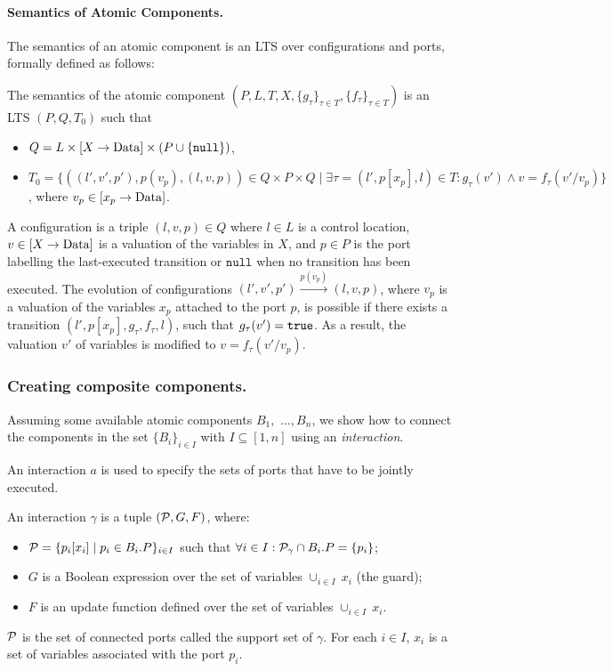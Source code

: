 %
\paragraph{Semantics of Atomic Components.}
The semantics of an atomic component is an LTS over configurations and ports, formally defined as follows:
%
\begin{definition}
The semantics of the atomic component $(P,L, T, X, \{g_{\tau}\}_{\tau \in T}, \{f_{\tau}\}_{\tau \in T})$ is an LTS $(P,Q,T_0)$ such that 
\begin{itemize}
\item $Q = L\times [X\rightarrow \mathrm{Data}]\times (P\cup \{\mathtt{null}\})$,
\item $T_0= \{ ((l',v',p'),p(v_{p}), (l,v,p))\in Q\times P\times Q\mid \exists \tau = (l', p[x_{p}], l) \in T: g_{\tau}(v') \wedge v=f_{\tau}(v'/v_{p})\}$, where $v_{p} \in[x_{p} \rightarrow \mathrm{Data}]$.
\end{itemize}
\end{definition}
%
A configuration is a triple $(l,v,p)\in Q$ where $l \in L$ is a control location, $v \in [X \rightarrow \mathit{\mathrm{Data}}]$ is a valuation of the variables in $X$, and $p \in P$ is the port labelling the last-executed transition or $\mathtt{null}$ when no transition has been executed. The evolution of configurations $(l', v',p')\stackrel{p(v_{p})}{\rightarrow} (l, v,p)$, where $v_{p}$ is a valuation of the variables $x_p$ attached to the port $p$, is possible if there exists a transition $(l', p[x_p], g_\tau, f_\tau, l)$, such that $g_\tau(v')=\mathtt{true}$. As a result, the valuation $v'$ of variables is modified to $v=f_\tau(v'/v_p)$.
%
\subsubsection{Creating composite components.} Assuming some available atomic components $B_1,$ $\ldots,B_n$, we show how to connect the components in the set $\{B_i\}_{i\in I}$ with $I\subseteq [1,n]$ using an \emph{interaction}.

An interaction $a$ is used to specify the sets of ports that have to be jointly executed.


\begin{definition}[Interaction]
\label{def:connector}
An interaction $\gamma$ is a tuple $({\cal P}, G,F)$, where:
\begin{itemize}
\item ${\cal P} = \{p_i[x_i]\mid p_i\in B_i.P\}_{i \in I}$ such that $\forall i\in I: {\cal P}_\gamma \cap B_i.P = \{p_i\}$;
\item $G$ is a Boolean expression over the set of variables $\cup_{i\in I}\ x_i$ (the guard);
\item $F$ is an update function defined over the set of variables $\cup_{i\in I}\ x_i$.
\end{itemize}
\end{definition}
%
${\cal P}$ is the set of connected ports called the support set of $\gamma$.
For each $i\in I$, $x_i$ is a set of variables associated with the port $p_i$.


